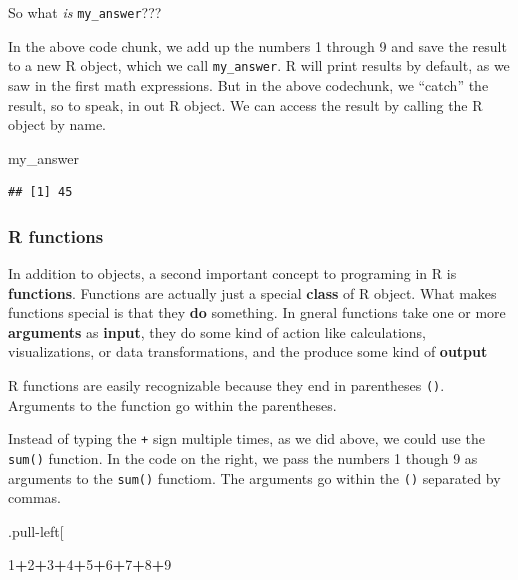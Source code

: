 \documentclass[
]{book}
\newenvironment{Shaded}{\begin{snugshade}}{\end{snugshade}}
\newcommand{\DecValTok}[1]{\textcolor[rgb]{0.00,0.00,0.81}{#1}}
\newcommand{\NormalTok}[1]{#1}
\newcommand{\SpecialCharTok}[1]{\textcolor[rgb]{0.81,0.36,0.00}{\textbf{#1}}}
\begin{document}
So what \emph{is} \texttt{my\_answer}???

In the above code chunk, we add up the numbers 1 through 9 and save the result to a new R object, which we call \texttt{my\_answer}. R will print results by default, as we saw in the first math expressions. But in the above codechunk, we ``catch'' the result, so to speak, in out R object. We can access the result by calling the R object by name.

\begin{Shaded}
\begin{Highlighting}[]
\NormalTok{my\_answer}
\end{Highlighting}
\end{Shaded}

\begin{verbatim}
## [1] 45
\end{verbatim}

\hypertarget{r-functions}{%
\subsubsection*{R functions}\label{r-functions}}

In addition to objects, a second important concept to programing in R is \textbf{functions}. Functions are actually just a special \textbf{class} of R object. What makes functions special is that they \textbf{do} something. In gneral functions take one or more \textbf{arguments} as \textbf{input}, they do some kind of action like calculations, visualizations, or data transformations, and the produce some kind of \textbf{output}

R functions are easily recognizable because they end in parentheses \texttt{()}. Arguments to the function go within the parentheses.

Instead of typing the \texttt{+} sign multiple times, as we did above, we could use the \texttt{sum()} function. In the code on the right, we pass the numbers 1 though 9 as arguments to the \texttt{sum()} functiom. The arguments go within the \texttt{()} separated by commas.

.pull-left{[}

\begin{Shaded}
\begin{Highlighting}[]
\DecValTok{1}\SpecialCharTok{+}\DecValTok{2}\SpecialCharTok{+}\DecValTok{3}\SpecialCharTok{+}\DecValTok{4}\SpecialCharTok{+}\DecValTok{5}\SpecialCharTok{+}\DecValTok{6}\SpecialCharTok{+}\DecValTok{7}\SpecialCharTok{+}\DecValTok{8}\SpecialCharTok{+}\DecValTok{9}
\end{Highlighting}
\end{Shaded}
\end{document}
